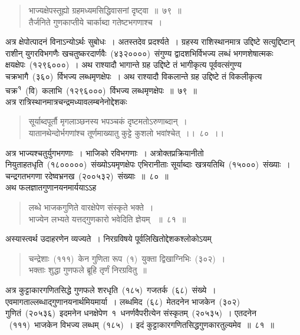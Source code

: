 \documentclass[11pt, openany]{book}
\begin{document}
\newpage
\thispagestyle{fancy}
\fancyhf{}
\begin{quote}
{\ks भाज्यक्षेपस्तूह्यो ग्रहमध्यमसिद्धिवासनां दृष्ट्वा~॥~७९~॥\\
तैर्जनिते गुणकाप्तीये चार्काब्दा गतेष्टभगणाश्च~।}
\end{quote}
\indent
अत्र क्षेपोत्पादनं विनाऽन्योऽर्थः सुबोधः~। अतस्तदेव प्रदर्श्यते~। ग्रहस्य राशिस्थानमात्र उद्दिष्टे सत्युद्दिष्टान् राशीन् युगरविभगणैः खचतुष्करदार्णवैः~(४३२००००)~संगुण्य द्वादशभिर्विभज्य लब्धं भगणशेषात्मकः क्षयक्षेपः~(१२९६०००)~। अथ राश्यादौ भागान्ते ग्रह उद्दिष्टे तं भागीकृत्य पूर्ववत्संगुण्य चक्रभागै~(३६०)~र्विभज्य लब्धमृणक्षेपः~। अथ राश्यादौ विकलान्ते ग्रह उद्दिष्टे तं विकलीकृत्य चक्र\textsuperscript{१}~(वि)~कलाभि~(१२९६०००)~र्विभज्य लब्धमृणक्षेपः~॥~७९~॥\\
\indent
अत्र रात्रिस्थानमात्रचन्द्रमध्यावलम्बनेनोद्देशकः\textendash
\begin{quote}
{\ku सूर्याब्दपूर्तौ मृगलाञ्छनस्य भपञ्चकं दृष्टमतोऽरुणाब्दान्~।\\
यातानथेन्दोर्भगणांश्च तूर्णमाख्यातु कुट्टे कुशलो भवांश्चेत्~।।~८०~।।}
\end{quote}
\indent
अत्र भाज्यश्चतुर्युगभगणाः~। भाजिको रविभगणाः~। अत्रोक्तप्रक्रियानीतो नियुताहतधृति~(१८०००००)~संख्योऽयमृणक्षेपः एभिरानीताः सूर्याब्दाः खत्रयतिथि~(१५०००)~संख्याः~। चन्द्रगतभगणा रदेष्वभ्रनख~(२००५३२)~संख्याः~॥~८०~॥\\
\indent
अथ फलज्ञातगुणानयनमार्ययाऽऽह\textendash
\begin{quote}
{\ks लब्धे भाजकगुणिते वारक्षेपेण संस्कृते भक्ते~।\\
भाज्येन लभ्यते यत्तद्गुणकारो भवेदिति ज्ञेयम् ~॥~८१~॥}
\end{quote}
\indent
अस्यास्त्वर्थ उदाहरणेन व्यज्यते~। निरग्रविषये पूर्वलिखितोद्देशकश्लोकोऽयम्\textendash
\begin{quote}
{\qt चन्द्रेशाः~(१११)~केन गुणिता रूप~(१)~युक्ता द्विखाग्निभिः~(३०२)~।\\
भक्ताः शुद्धा गुणफले ब्रूहि तृर्णं निरग्रवितु~॥}
\end{quote}

\indent
अत्र कुट्टाकारगणितसिद्धे गुणफले शरधृति~(१८५)~गजतर्क~(६८)~संख्ये~। एवमागताल्लब्धाद्गुणानयनार्थमियमार्या~। लब्धमिद~(६८)~मेतदनेन भाजकेन~(३०२)~ गुणितं~(२०५३६)~इदमनेन धनक्षेपेण~१~धनर्णवैपरीत्येन संस्कृतम्~(२०५३५)~। एतदनेन ~(१११)~भाजकेन विभज्य लब्धम्~(१८५)~। इदं कुट्टाकारगणितसिद्धगुणकारतुल्यमेव~॥~८१~॥
\end{document}
